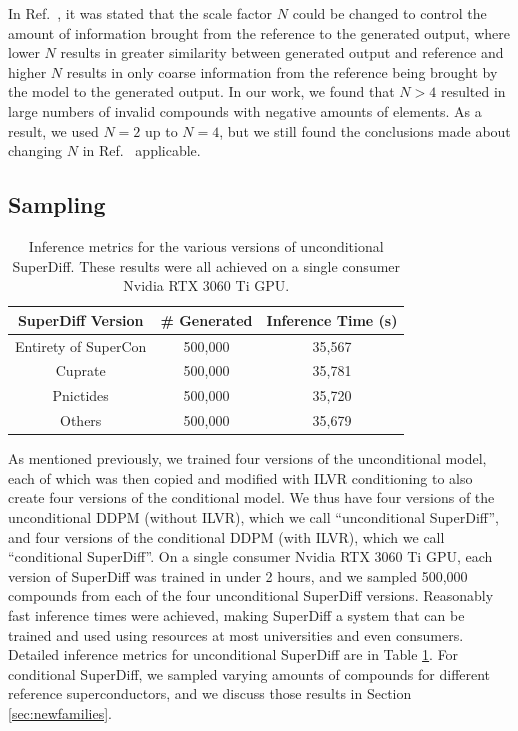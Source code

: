 \documentclass[%
reprint,
 amsmath,amssymb,
 aps,
prb,
]{revtex4-2}
\begin{document}
In Ref.~\cite{choi2021ilvr}, it was stated that the scale factor $N$ could be changed to control the amount of information brought from the reference to the generated output, where lower $N$ results in greater similarity between generated output and reference and higher $N$ results in only coarse information from the reference being brought by the model to the generated output. In our work, we found that $N > 4$ resulted in large numbers of invalid compounds with negative amounts of elements. As a result, we used $N = 2$ up to $N = 4$, but we still found the conclusions made about changing $N$ in Ref.~\cite{choi2021ilvr} applicable.



\subsection{Sampling}
\label{sec:sampling}



\begin{table}
    \centering
    \begin{ruledtabular}
    \begin{tabular}{ccc}
        SuperDiff Version & \# Generated & Inference Time (s) \\
        \hline
        Entirety of SuperCon & 500,000 & 35,567 \\
        Cuprate  & 500,000 &  35,781 \\
        Pnictides  & 500,000 & 35,720 \\
        Others &  500,000 & 35,679
    \end{tabular}
    \end{ruledtabular}
    
    \caption{Inference metrics for the various versions of unconditional SuperDiff. These results were all achieved on a single consumer Nvidia RTX 3060 Ti GPU.}
    \label{tab:inferencetime}
\end{table}

As mentioned previously, we trained four versions of the unconditional model, each of which was then copied and modified with ILVR conditioning to also create four versions of the conditional model. We thus have four versions of the unconditional DDPM (without ILVR), which we call ``unconditional SuperDiff'', and four versions of the conditional DDPM (with ILVR), which we call ``conditional SuperDiff''. On a single consumer Nvidia RTX 3060 Ti GPU, each version of SuperDiff was trained in under 2 hours, and we sampled 500,000 compounds from each of the four unconditional SuperDiff versions. Reasonably fast inference times were achieved, making SuperDiff a system that can be trained and used using resources at most universities and even consumers. Detailed inference metrics for unconditional SuperDiff are in Table \ref{tab:inferencetime}. For conditional SuperDiff, we sampled varying amounts of compounds for different reference superconductors, and we discuss those results in Section \ref{sec:newfamilies}.
\end{document}
